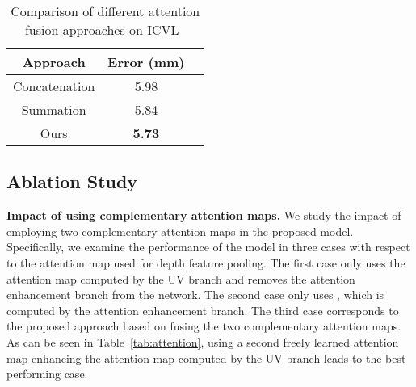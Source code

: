 \documentclass{article}
\begin{document}
\begin{table}[t]
\caption{Comparison of different attention fusion approaches on ICVL~\cite{tang2014latent}}
\centering
\setlength{\tabcolsep}{10pt}
\renewcommand{\arraystretch}{1.05}
\begin{tabular}{ccc}
            \hline
            Approach  &   Error (mm)      \\
            \hline
                Concatenation          &         5.98    \\
                Summation      &         5.84    \\
                Ours     &  \textbf{5.73}   \\
        
            \hline
        \end{tabular}
\label{tab:attentionFusion}
\end{table}
 
\subsection{Ablation Study} \label{subsection:ablation}
\textbf{Impact of using complementary attention maps.} We study the impact of employing two complementary attention maps in the proposed model. Specifically, we examine the performance of the model in three cases with respect to the attention map used for depth feature pooling. The first case only uses the attention map computed by the UV branch and removes the attention enhancement branch from the network. The second case only uses , which is computed by the attention enhancement branch. The third case corresponds to the proposed approach based on fusing the two complementary attention maps. As can be seen in Table~\ref{tab:attention}, using a second freely learned attention map enhancing the attention map computed by the UV branch leads to the best performing case.
           
\end{document}
